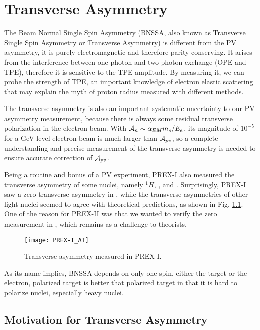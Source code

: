 \chapter{Transverse Asymmetry}
The Beam Normal Single Spin Asymmetry (BNSSA, also known as Transverse Single Spin Asymmetry
or Transverse Asymmetry) is different from the PV asymmetry, it is purely 
electromagnetic and therefore parity-conserving. It arises from the interference
between one-photon and two-photon exchange (OPE and TPE), therefore it is sensitive 
to the TPE amplitude. By measuring it, we can probe the strength of TPE, an 
important knowledge of electron elastic scattering that may explain the myth
of proton radius measured with different methods.

The transverse asymmetry is also an important systematic uncertainty to our PV 
asymmetry measurement, because there is always some residual transverse polarization
in the electron beam. With $\mathcal{A}_n \sim \alpha_{EM}m_e/E_e$, its magnitude of $10^{-5}$
for a GeV level electron beam is much larger than $\mathcal{A}_{pv}$, so a complete 
understanding and precise measurement of the transverse asymmetry is needed
to ensure accurate correction of $\mathcal{A}_{pv}$.

Being a routine and bonus of a PV experiment, PREX-I also measured the transverse
asymmetry of some nuclei, namely ${}^{1}H$, \He, \C and \Pb. Surprisingly, PREX-I
saw a zero transverse asymmetry in \Pb, while the transverse asymmetries of other 
light nuclei seemed to agree with theoretical predictions, as shown in 
Fig. \ref{fig:PREX-I_AT}. One of the reason for PREX-II was that we wanted to
verify the zero measurement in \Pb, which remains as a challenge to theorists.
\begin{figure}
    \centering
    \texttt{[image: PREX-I\_AT]}
    \caption{Transverse asymmetry measured in PREX-I.}
    \label{fig:PREX-I_AT}
\end{figure}

As its name implies, BNSSA depends on only one spin, either the target or the
electron, polarized target is better that polarized target in that it is hard
to polarize nuclei, especially heavy nuclei.

\section{Motivation for Transverse Asymmetry}

